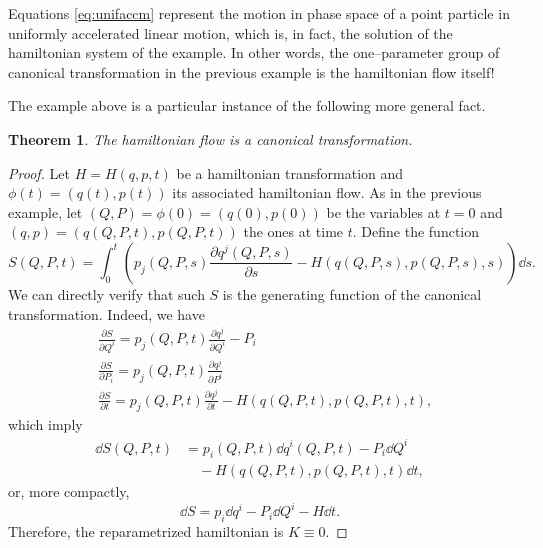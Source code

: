 \documentclass[english,fontsize=11pt,paper=b5]{scrbook}
\numberwithin{equation}{chapter}
\newtheorem{theorem}{Theorem}[chapter]
\theoremstyle{definition}
\begin{document}
    Equations \eqref{eq:unifaccm} represent the motion in phase space of a point particle in uniformly accelerated linear motion, which is, in fact, the solution of the hamiltonian system of the example.
    In other words, the one--parameter group of canonical transformation in the previous example is the hamiltonian flow itself!

    The example above is a particular instance of the following more general fact.

    \begin{theorem}
      The hamiltonian flow is a canonical transformation.
    \end{theorem}
    \begin{proof}
      Let $H = H(q,p,t)$ be a hamiltonian transformation and $\phi(t) = (q(t), p(t))$ its associated hamiltonian flow.
      As in the previous example, let $(Q, P) = \phi(0) = (q(0), p(0))$ be the variables at $t=0$ and $(q, p) = (q(Q,P,t), p(Q,P,t))$ the ones at time $t$. Define the function
      \begin{equation}
        S(Q,P,t) = \int_0^t\left(
          p_j(Q,P,s)\frac{\partial q^j(Q,P,s)}{\partial s} - H(q(Q,P,s), p(Q,P,s), s)
        \right)\dd s.
      \end{equation}
      We can directly verify that such $S$ is the generating function of the canonical transformation. Indeed, we have
      \begin{align}
     & \frac{\partial S}{\partial Q^i} = p_j(Q,P,t) \frac{\partial q^j}{\partial Q^i} - P_i                   \\
     & \frac{\partial S}{\partial P_i} = p_j(Q,P,t) \frac{\partial q^j}{\partial P^i}                         \\
     & \frac{\partial S}{\partial t} = p_j(Q,P,t) \frac{\partial q^j}{\partial t} - H(q(Q,P,t), p(Q,P,t), t),
      \end{align}
      which imply
      \begin{align}
        \dd S(Q, P, t) & = p_i(Q, P, t) \dd q^i (Q, P, t) - P_i \dd Q^i \\
                       & \quad - H(q(Q,P,t), p(Q,P,t), t) \dd t,
      \end{align}
      or, more compactly,
      \begin{equation}
        \dd S = p_i \dd q^i - P_i \dd Q^i - H \dd t.
      \end{equation}
      Therefore, the reparametrized hamiltonian is $K\equiv 0$.
    \end{proof}
\end{document}

